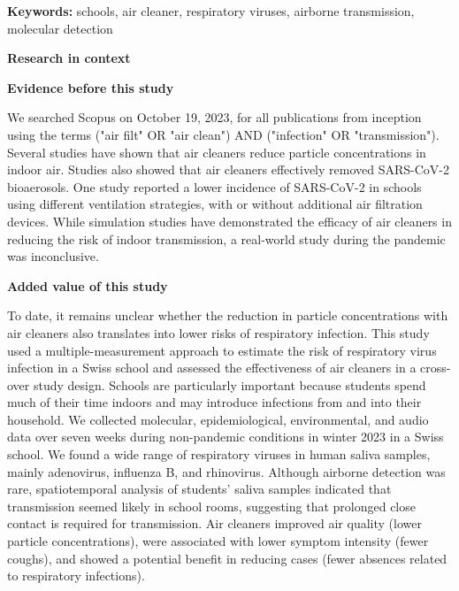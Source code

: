 \documentclass[fleqn,11pt]{wlscirep}
\begin{document}
\vspace{2em}

\vspace{0.5em}

\noindent\textbf{Keywords:} schools, air cleaner, respiratory viruses, airborne transmission, molecular detection

\thispagestyle{empty}
\sloppy
\raggedbottom

\newpage

\noindent\textbf{\Large{Research in context}} \medskip

\noindent \textbf{Evidence before this study} \smallskip

\noindent We searched Scopus on October 19, 2023, for all publications from inception using the terms ("air filt" OR "air clean") AND ("infection" OR "transmission"). Several studies have shown that air cleaners reduce particle concentrations in indoor air. Studies also showed that air cleaners effectively removed SARS-CoV-2 bioaerosols. One study reported a lower incidence of SARS-CoV-2 in schools using different ventilation strategies, with or without additional air filtration devices. While simulation studies have demonstrated the efficacy of air cleaners in reducing the risk of indoor transmission, a real-world study during the pandemic was inconclusive. \medskip

\noindent \textbf{Added value of this study} \smallskip

\noindent To date, it remains unclear whether the reduction in particle concentrations with air cleaners also translates into lower risks of respiratory infection. This study used a multiple-measurement approach to estimate the risk of respiratory virus infection in a Swiss school and assessed the effectiveness of air cleaners in a cross-over study design. Schools are particularly important because students spend much of their time indoors and may introduce infections from and into their household. We collected molecular, epidemiological, environmental, and audio data over seven weeks during non-pandemic conditions in winter 2023 in a Swiss school. We found a wide range of respiratory viruses in human saliva samples, mainly adenovirus, influenza B, and rhinovirus. Although airborne detection was rare, spatiotemporal analysis of students' saliva samples indicated that transmission seemed likely in school rooms, suggesting that prolonged close contact is required for transmission. Air cleaners improved air quality (lower particle concentrations), were associated with lower symptom intensity (fewer coughs), and showed a potential benefit in reducing cases (fewer absences related to respiratory infections).\medskip
\end{document}
